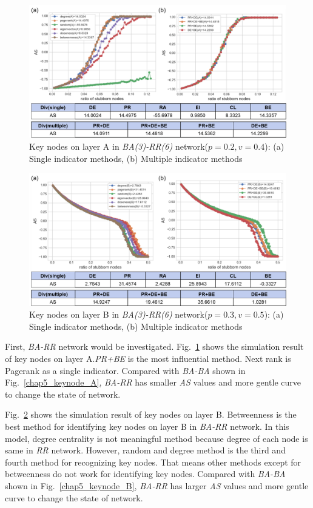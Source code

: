\begin{figure}[!htb]
	\centering
	\includegraphics[width=\hsize]{figure/chap5_keynode_BA_RR_A.png}
	\caption{Key nodes on layer A in \textit{BA(3)-RR(6)} network($p=0.2, v=0.4$):
		(a) Single indicator methods, (b) Multiple indicator methods}
	\label{chap5_keynode_BA_RR_A}
\end{figure}
\begin{figure}[!htb]
	\centering
	\includegraphics[width=\hsize]{figure/chap5_keynode_BA_RR_B.png}
	\caption{Key nodes on layer B in \textit{BA(3)-RR(6)} network($p=0.3, v=0.5$):
		(a) Single indicator methods, (b) Multiple indicator methods}
	\label{chap5_keynode_BA_RR_B}
\end{figure}

First, \textit{BA-RR} network would be investigated. Fig.~\ref{chap5_keynode_BA_RR_A} shows the simulation result of key nodes on layer A.\textit{PR+BE} is the most influential method. Next rank is Pagerank as a single indicator. Compared with \textit{BA-BA} shown in Fig.~\ref{chap5_keynode_A}, \textit{BA-RR} has smaller \textit{AS} values and more gentle curve to change the state of network. 

Fig.~\ref{chap5_keynode_BA_RR_B} shows the simulation result of key nodes on layer B. Betweenness is the best method for identifying key nodes on layer B in \textit{BA-RR} network. In this model, degree centrality is not meaningful method because degree of each node is same in \textit{RR} network. However, random and degree method is the third and fourth method for recognizing key nodes. That means other methods except for betweenness do not work for identifying key nodes. Compared with \textit{BA-BA} shown in Fig.~\ref{chap5_keynode_B}, \textit{BA-RR} has larger \textit{AS} values and more gentle curve to change the state of network. 

